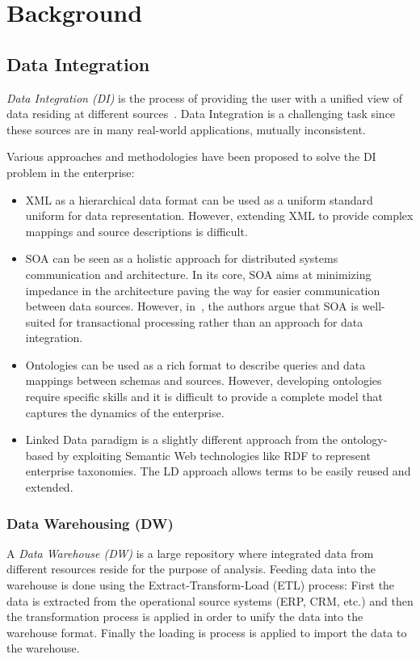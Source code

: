 \chapter{Background} \label{chapter:part2-background}
\graphicspath{{Part2/Background/figures/}}

\section{Data Integration}\label{section:dataIntegration}

\textit{Data Integration (DI)} is the process of providing the user with a unified view of data residing at different sources~\cite{Lenzerini:DIT:02}. Data Integration is a challenging task since these sources are in many real-world applications, mutually inconsistent.

Various approaches and methodologies have been proposed to solve the DI problem in the enterprise:
\begin{itemize}
	\item XML as a hierarchical data format can be used as a uniform standard uniform for data representation. However, extending XML to provide complex mappings and source descriptions is difficult.
	\item SOA can be seen as a holistic approach for distributed systems communication and architecture. In its core, SOA aims at minimizing impedance in the architecture paving the way for easier communication between data sources. However, in~\cite{Frischmuth:ISWC:13}, the authors argue that SOA is well-suited for transactional processing rather than an approach for data integration.
	\item Ontologies can be used as a rich format to describe queries and data mappings between schemas and sources. However, developing ontologies require specific skills and it is difficult to provide a complete model that captures the dynamics of the enterprise.
	\item Linked Data paradigm is a slightly different approach from the ontology-based by exploiting Semantic Web technologies like RDF to represent enterprise taxonomies. The LD approach allows terms to be easily reused and extended.
\end{itemize}

\subsection{Data Warehousing (DW)}

A \textit{Data Warehouse (DW)} is a large repository where integrated data from different resources reside for the purpose of analysis. Feeding data into the warehouse is done using the Extract-Transform-Load (ETL) process: First the data is extracted from the operational source systems (ERP, CRM, etc.) and then the transformation process is applied in order to unify the data into the warehouse format. Finally the loading is process is applied to import the data to the warehouse.


